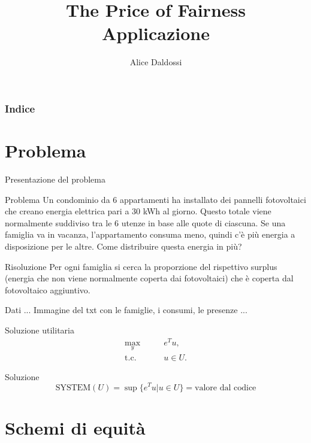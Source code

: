 \documentclass{beamer}
\title{The Price of Fairness\\Applicazione}
\author{Alice Daldossi}
\institute{Università degli Studi di Pavia}
\date
\begin{document}
	
	\frame{\titlepage}
	
\begin{frame}
	\frametitle{Indice}
	\tableofcontents
\end{frame}

\section{Problema}

\begin{frame}{Presentazione del problema}
\begin{block}{Problema}
	Un condominio da 6 appartamenti ha installato dei pannelli fotovoltaici che creano energia elettrica pari a 30 kWh al giorno. Questo totale viene normalmente suddiviso tra le 6 utenze in base alle quote di ciascuna. Se una famiglia va in vacanza, l'appartamento consuma meno, quindi c'è più energia a disposizione per le altre. Come distribuire questa energia in più?
\end{block}
\begin{block}{Risoluzione}
	 Per ogni famiglia si cerca la proporzione del rispettivo surplus (energia che non viene normalmente coperta dai fotovoltaici) che è coperta dal fotovoltaico aggiuntivo.
\end{block}
\end{frame}

\begin{frame}{Dati}
	... Immagine del txt con le famiglie, i consumi, le presenze ...
\end{frame}

\begin{frame}{Soluzione utilitaria}
	\begin{equation}
		\begin{split}
			\underset{y}{\text{max}} & \qquad e^T u, \\
			\text{t.c.} & \qquad u \in U.
		\end{split}
	\end{equation}
	\begin{block}{Soluzione}
		\begin{equation}
			\text{SYSTEM}(U) = \sup \{e^T u | u \in U\} = \text{valore dal codice}
		\end{equation}
	\end{block}
\end{frame}

\section{Schemi di equità}
\end{document}

